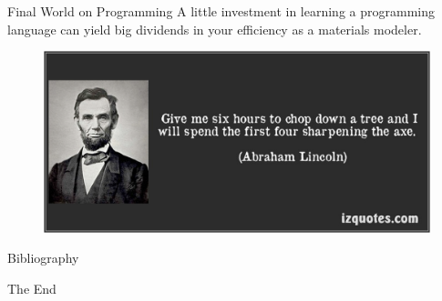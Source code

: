 \documentclass[aspectratio=169]{beamer}
\begin{document}
    \begin{frame}{Final World on Programming}
        A little investment in learning a programming language can yield big dividends in your efficiency as a materials modeler.
        \begin{figure}
            \centering
            \includegraphics[width=0.7\linewidth]{lectures/figures/9_lincoln.png}
        \end{figure}
    \end{frame}

    \begin{frame}[allowframebreaks]{Bibliography}
        
        
    \end{frame}



    \begin{frame}
        \Huge{\centerline{The End}}
    \end{frame}
\end{document}
